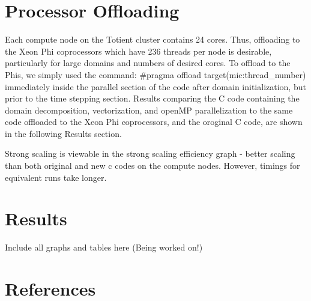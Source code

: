 \documentclass{article}
\begin{document}
\section{Processor Offloading}
Each compute node on the Totient cluster contains 24 cores. Thus, offloading to the Xeon Phi coprocessors which have 236 threads per node is desirable, particularly for large domains and numbers of desired cores. To offload to the Phis, we simply used the command: \#pragma offload target(mic:thread\_number) immediately inside the parallel section of the code after domain initialization, but prior to the time stepping section. Results comparing the C code containing the domain decomposition, vectorization, and openMP parallelization to the same code offloaded to the Xeon Phi coprocessors, and the oroginal C code, are shown in the following Results section. 

Strong scaling is viewable in the strong scaling efficiency graph - better scaling than both original and new c codes on the compute nodes. However, timings for equivalent runs take longer.

\section{Results}
Include all graphs and tables here (Being worked on!)

\section{References}
\end{document}
